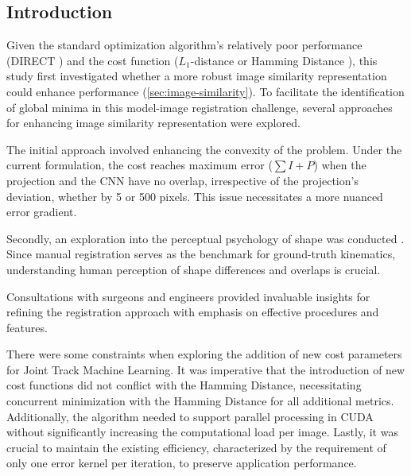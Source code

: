 \subsection{Introduction}
Given the standard optimization algorithm's relatively poor performance (DIRECT \cite{jonesLipschitzianOptimizationLipschitz1993,floodAutomatedRegistration3D2018}) and the cost function ($L_{1}$-distance or Hamming Distance \cite{floodAutomatedRegistration3D2018}), this study first investigated whether a more robust image similarity representation could enhance performance (\cref{sec:image-similarity}).
To facilitate the identification of global minima in this model-image registration challenge, several approaches for enhancing image similarity representation were explored.

The initial approach involved enhancing the convexity of the problem.
Under the current formulation, the cost reaches maximum error ($\sum I + P$) when the projection and the CNN have no overlap, irrespective of the projection's deviation, whether by 5 or 500 pixels.
This issue necessitates a more nuanced error gradient.

Secondly, an exploration into the perceptual psychology of shape was conducted \cite{attneaveInformationalAspectsVisual1954,attneaveQuantitativeStudyShape1956}.
Since manual registration serves as the benchmark for ground-truth kinematics, understanding human perception of shape differences and overlaps is crucial.

Consultations with surgeons and engineers provided invaluable insights for refining the registration approach with emphasis on effective procedures and features.

There were some constraints when exploring the addition of new cost parameters for Joint Track Machine Learning.
It was imperative that the introduction of new cost functions did not conflict with the Hamming Distance, necessitating concurrent minimization with the Hamming Distance for all additional metrics.
Additionally, the algorithm needed to support parallel processing in CUDA without significantly increasing the computational load per image.
Lastly, it was crucial to maintain the existing efficiency, characterized by the requirement of only one error kernel per iteration, to preserve application performance.
